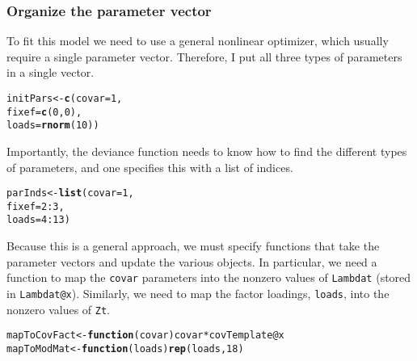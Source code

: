 \documentclass[12pt]{article}\usepackage[]{graphicx}\usepackage[]{color}
\makeatletter
\newcommand{\hlnum}[1]{\textcolor[rgb]{0.686,0.059,0.569}{#1}}%
\newcommand{\hlopt}[1]{\textcolor[rgb]{0,0,0}{#1}}%
\newcommand{\hlstd}[1]{\textcolor[rgb]{0.345,0.345,0.345}{#1}}%
\newcommand{\hlkwa}[1]{\textcolor[rgb]{0.161,0.373,0.58}{\textbf{#1}}}%
\newcommand{\hlkwb}[1]{\textcolor[rgb]{0.69,0.353,0.396}{#1}}%
\newcommand{\hlkwc}[1]{\textcolor[rgb]{0.333,0.667,0.333}{#1}}%
\newcommand{\hlkwd}[1]{\textcolor[rgb]{0.737,0.353,0.396}{\textbf{#1}}}%
\newenvironment{kframe}{%
 \def\at@end@of@kframe{}%
 \ifinner\ifhmode%
  \def\at@end@of@kframe{\end{minipage}}%
  \begin{minipage}{\columnwidth}%
 \fi\fi%
 \def\FrameCommand##1{\hskip\@totalleftmargin \hskip-\fboxsep
 \colorbox{shadecolor}{##1}\hskip-\fboxsep
     \hskip-\linewidth \hskip-\@totalleftmargin \hskip\columnwidth}%
 \MakeFramed {\advance\hsize-\width
   \@totalleftmargin\z@ \linewidth\hsize
   \@setminipage}}%
 {\par\unskip\endMakeFramed%
 \at@end@of@kframe}
\newenvironment{knitrout}{}{} %
\makeatother
\begin{document}
\subsubsection{Organize the parameter vector}

To fit this model we need to use a general nonlinear optimizer, which
usually require a single parameter vector.  Therefore, I put all three
types of parameters in a single vector.
\begin{knitrout}
\color{fgcolor}\begin{kframe}
\begin{alltt}
\hlstd{initPars} \hlkwb{<-} \hlkwd{c}\hlstd{(}\hlkwc{covar} \hlstd{=} \hlnum{1}\hlstd{,}
              \hlkwc{fixef} \hlstd{=} \hlkwd{c}\hlstd{(}\hlnum{0}\hlstd{,} \hlnum{0}\hlstd{),}
              \hlkwc{loads} \hlstd{=} \hlkwd{rnorm}\hlstd{(}\hlnum{10}\hlstd{))}
\end{alltt}
\end{kframe}
\end{knitrout}
Importantly, the deviance function needs to know how to find the
different types of parameters, and one specifies this with a list of
indices.
\begin{knitrout}
\color{fgcolor}\begin{kframe}
\begin{alltt}
\hlstd{parInds} \hlkwb{<-} \hlkwd{list}\hlstd{(}\hlkwc{covar} \hlstd{=} \hlnum{1}\hlstd{,}
                \hlkwc{fixef} \hlstd{=} \hlnum{2}\hlopt{:}\hlnum{3}\hlstd{,}
                \hlkwc{loads} \hlstd{=} \hlnum{4}\hlopt{:}\hlnum{13}\hlstd{)}
\end{alltt}
\end{kframe}
\end{knitrout}
Because this is a general approach, we must specify functions that
take the parameter vectors and update the various objects.  In
particular, we need a function to map the \texttt{covar} parameters
into the nonzero values of \texttt{Lambdat} (stored in
\texttt{Lambdat@x}).  Similarly, we need to map the factor loadings,
\texttt{loads}, into the nonzero values of \texttt{Zt}.
\begin{knitrout}
\color{fgcolor}\begin{kframe}
\begin{alltt}
\hlstd{mapToCovFact} \hlkwb{<-} \hlkwa{function}\hlstd{(}\hlkwc{covar}\hlstd{) covar} \hlopt{*} \hlstd{covTemplate}\hlopt{@}\hlkwc{x}
\hlstd{mapToModMat} \hlkwb{<-} \hlkwa{function}\hlstd{(}\hlkwc{loads}\hlstd{)} \hlkwd{rep}\hlstd{(loads,} \hlnum{18}\hlstd{)}
\end{alltt}
\end{kframe}
\end{knitrout}
\end{document}
